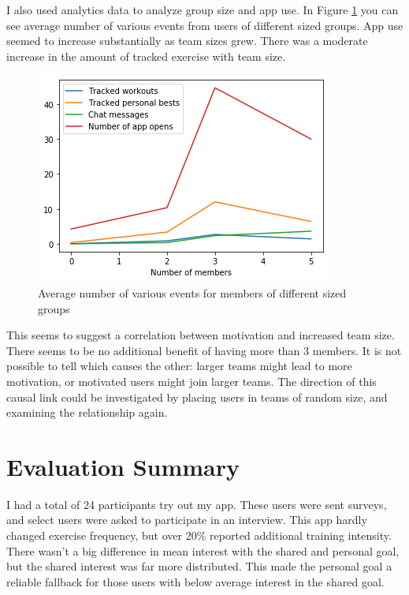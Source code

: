 \documentclass{l4proj}
\begin{document}
I also used analytics data to analyze group size and app use. In Figure \ref{fig:exercises} you can see average number of various events from users of different sized groups. App use seemed to increase substantially as team sizes grew. There was a moderate increase in the amount of tracked exercise with team size.
\begin{figure}[H]
    \centering
    \includegraphics[width=1.0\linewidth]{data/activity.png}    
    \caption{Average number of various events for members of different sized groups}
    \label{fig:exercises} 
\end{figure}

This seems to suggest a correlation between motivation and increased team size. There seems to be no additional benefit of having more than 3 members. It is not possible to tell which causes the other: larger teams might lead to more motivation, or motivated users might join larger teams. The direction of this causal link could be investigated by placing users in teams of random size, and examining the relationship again.


\section{Evaluation Summary}
I had a total of 24 participants try out my app. These users were sent surveys, and select users were asked to participate in an interview. This app hardly changed exercise frequency, but over 20\% reported additional training intensity. There wasn't a big difference in mean interest with the shared and personal goal, but the shared interest was far more distributed. This made the personal goal a reliable fallback for those users with below average interest in the shared goal. 
\end{document}
